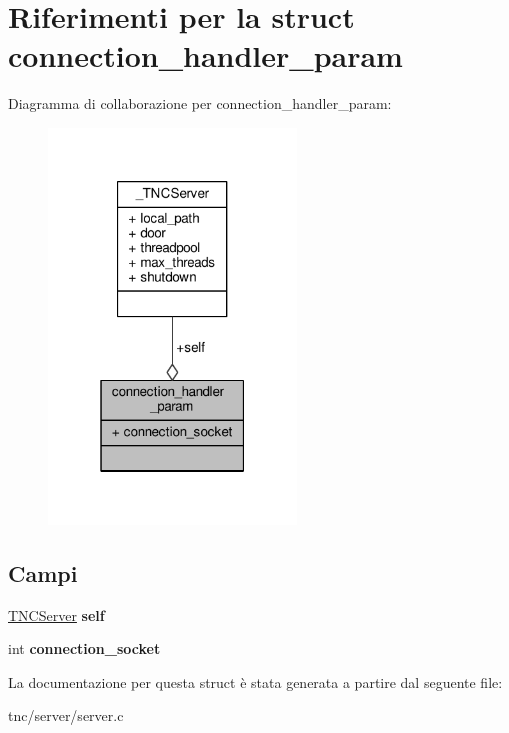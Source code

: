 \hypertarget{structconnection__handler__param}{}\section{Riferimenti per la struct connection\+\_\+handler\+\_\+param}
\label{structconnection__handler__param}


Diagramma di collaborazione per connection\+\_\+handler\+\_\+param\+:
\nopagebreak
\begin{figure}[H]
\begin{center}
\leavevmode
\includegraphics[width=187pt]{structconnection__handler__param__coll__graph}
\end{center}
\end{figure}
\subsection*{Campi}
\begin{DoxyCompactItemize}
\item 
\hypertarget{structconnection__handler__param_ac00d07605e2e4653f5283ac29698526b}{}\hyperlink{struct__TNCServer}{T\+N\+C\+Server} {\bfseries self}\label{structconnection__handler__param_ac00d07605e2e4653f5283ac29698526b}

\item 
\hypertarget{structconnection__handler__param_a3b1d6c2c7840e8d41336d2375d064470}{}int {\bfseries connection\+\_\+socket}\label{structconnection__handler__param_a3b1d6c2c7840e8d41336d2375d064470}

\end{DoxyCompactItemize}


La documentazione per questa struct è stata generata a partire dal seguente file\+:\begin{DoxyCompactItemize}
\item 
tnc/server/server.\+c\end{DoxyCompactItemize}
